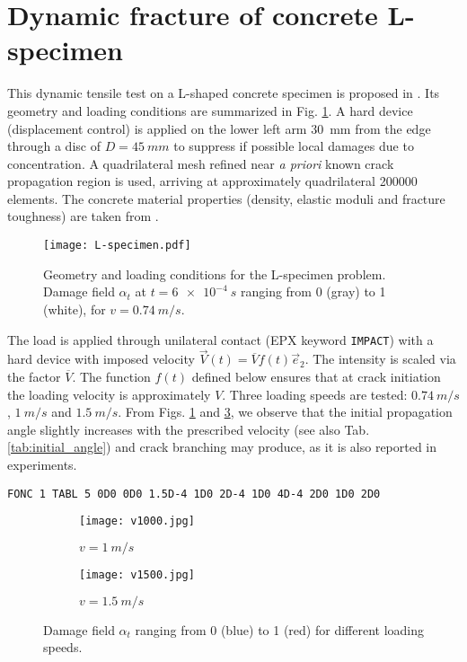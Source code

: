\section{Dynamic fracture of concrete L-specimen}
This dynamic tensile test on a L-shaped concrete specimen is proposed in \cite{OzboltBedeSharmaMayer:2015}. Its geometry and loading conditions are summarized in Fig. \ref{fig:L-specimen}. A hard device (displacement control) is applied on the lower left arm \SI{30}{mm} from the edge through a disc of $D=\SI{45}{mm}$ to suppress if possible local damages due to concentration. A quadrilateral mesh refined near \emph{a priori} known crack propagation region is used, arriving at approximately quadrilateral \num{200000} elements. The concrete material properties (density, elastic moduli and fracture toughness) are taken from \cite{OzboltBedeSharmaMayer:2015}.
\begin{figure}[htbp]
\centering
\texttt{[image: L-specimen.pdf]}
\caption{Geometry and loading conditions for the L-specimen problem. Damage field $\alpha_t$ at $t=\SI{6e-4}{s}$ ranging from 0 (gray) to 1 (white), for $v=\SI{0.74}{m/s}$.} \label{fig:L-specimen}
\end{figure}

The load is applied through unilateral contact (EPX keyword \texttt{IMPACT}) with a hard device with imposed velocity $\vec{V}(t)=\overline{V}f(t)\vec{e}_2$. The intensity is scaled via the factor $\overline{V}$. The function $f(t)$ defined below ensures that at crack initiation the loading velocity is approximately $V$. Three loading speeds are tested: $\SI{0.74}{m/s}$, $\SI{1}{m/s}$ and $\SI{1.5}{m/s}$. From Figs. \ref{fig:L-specimen} and \ref{fig:alpha_L}, we observe that the initial propagation angle slightly increases with the prescribed velocity (see also Tab. \ref{tab:initial_angle}) and crack branching may produce, as it is also reported in experiments.
\begin{mdframed}[hidealllines=true,backgroundcolor=gray!20]
\begin{verbatim}
FONC 1 TABL 5 0D0 0D0 1.5D-4 1D0 2D-4 1D0 4D-4 2D0 1D0 2D0
\end{verbatim}
\end{mdframed}

\begin{figure}[htbp]
\centering
\begin{subfigure}[b]{0.48\textwidth}
\centering
\texttt{[image: v1000.jpg]}
\caption{$v=\SI{1}{m/s}$}
\end{subfigure}
\begin{subfigure}[b]{0.48\textwidth}
\centering
\texttt{[image: v1500.jpg]}
\caption{$v=\SI{1.5}{m/s}$} \label{fig:v15ell1}
\end{subfigure}
\caption{Damage field $\alpha_t$ ranging from 0 (blue) to 1 (red) for different loading speeds.} \label{fig:alpha_L}
\end{figure}

